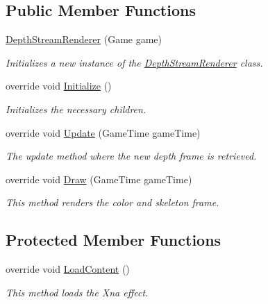 \subsection*{Public Member Functions}
\begin{DoxyCompactItemize}
\item 
\hyperlink{class_microsoft_1_1_samples_1_1_kinect_1_1_avateering_1_1_depth_stream_renderer_a7c2b33729bd434ec17bf5488c8977429}{Depth\+Stream\+Renderer} (Game game)
\begin{DoxyCompactList}\small\item\em Initializes a new instance of the \hyperlink{class_microsoft_1_1_samples_1_1_kinect_1_1_avateering_1_1_depth_stream_renderer}{Depth\+Stream\+Renderer} class. \end{DoxyCompactList}\item 
override void \hyperlink{class_microsoft_1_1_samples_1_1_kinect_1_1_avateering_1_1_depth_stream_renderer_ad45239b592f01487e492740a43e63ba2}{Initialize} ()
\begin{DoxyCompactList}\small\item\em Initializes the necessary children. \end{DoxyCompactList}\item 
override void \hyperlink{class_microsoft_1_1_samples_1_1_kinect_1_1_avateering_1_1_depth_stream_renderer_a365af6c9d57d70df4921d6f7ea2ba90e}{Update} (Game\+Time game\+Time)
\begin{DoxyCompactList}\small\item\em The update method where the new depth frame is retrieved. \end{DoxyCompactList}\item 
override void \hyperlink{class_microsoft_1_1_samples_1_1_kinect_1_1_avateering_1_1_depth_stream_renderer_a975a1d4c53be24b3336110fa2985a68f}{Draw} (Game\+Time game\+Time)
\begin{DoxyCompactList}\small\item\em This method renders the color and skeleton frame. \end{DoxyCompactList}\end{DoxyCompactItemize}
\subsection*{Protected Member Functions}
\begin{DoxyCompactItemize}
\item 
override void \hyperlink{class_microsoft_1_1_samples_1_1_kinect_1_1_avateering_1_1_depth_stream_renderer_a2781c13877e0081c4d4e2ba49766909b}{Load\+Content} ()
\begin{DoxyCompactList}\small\item\em This method loads the Xna effect. \end{DoxyCompactList}\end{DoxyCompactItemize}
